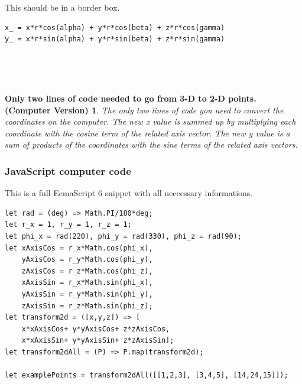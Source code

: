 \documentclass[a4paper]{article}
\begin{document}
This should be in a border box.\\


\begin{example}
\begin{lstlisting}
x_ = x*r*cos(alpha) + y*r*cos(beta) + z*r*cos(gamma)
y_ = x*r*sin(alpha) + y*r*sin(beta) + z*r*sin(gamma)
\end{lstlisting}\\

\end{example}\\

\newtheorem{CodeTheorem}{Only two lines of code needed to go from 3-D to 2-D points. (Computer Version)}
\begin{CodeTheorem}
The only two lines of code you need to convert the coordinates on the computer. The new x value
is summed up by multiplying each coordinate with the cosine term of the related axis vector. The new y value
is a sum of products of the coordinates with the sine terms of the related axis vectors.
\end{CodeTheorem}

\subsubsection{JavaScript computer code}
\begin{example}
This is a full EcmaScript 6 snippet with all neccessary informations.\\
\begin{lstlisting}
let rad = (deg) => Math.PI/180*deg;
let r_x = 1, r_y = 1, r_z = 1; 
let phi_x = rad(220), phi_y = rad(330), phi_z = rad(90); 
let xAxisCos = r_x*Math.cos(phi_x), 
    yAxisCos = r_y*Math.cos(phi_y),
    zAxisCos = r_z*Math.cos(phi_z),
    xAxisSin = r_x*Math.sin(phi_x), 
    yAxisSin = r_y*Math.sin(phi_y),
    zAxisSin = r_z*Math.sin(phi_z);
let transform2d = ([x,y,z]) => [
    x*xAxisCos+ y*yAxisCos+ z*zAxisCos,
    x*xAxisSin+ y*yAxisSin+ z*zAxisSin];
let transform2dAll = (P) => P.map(transform2d);

let examplePoints = transform2dAll([[1,2,3], [3,4,5], [14,24,15]]);
\end{lstlisting}
\end{example}\\
\end{document}
